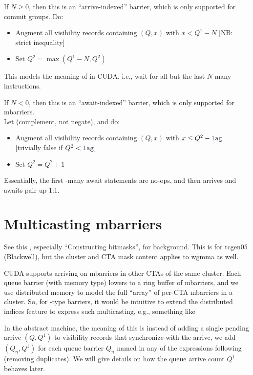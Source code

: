 \filbreak
If $N \geq 0$, then this is an ``arrive-indexed'' barrier, which is only supported for commit groups. Do:
\begin{itemize}
  \item Augment all visibility records containing $(Q, x)$ with $x < Q^1 - N$ [NB: strict inequality]
  \item Set $Q^2 = \max(Q^1 - N, Q^2)$
\end{itemize}
This models the meaning of  in CUDA, i.e., wait for all but the last $N$-many  instructions.

\filbreak
If $N < 0$, then this is an ``await-indexed'' barrier, which is only supported for mbarriers.\\
Let  (complement, not negate), and do:
\begin{itemize}
  \item Augment all visibility records containing $(Q, x)$ with $x \leq Q^2 - \lighttt{lag}$ [trivially false if $Q^2 < \lighttt{lag}$]
  \item Set $Q^2 = Q^2 + 1$
\end{itemize}
Essentially, the first -many await statements are no-ops, and then arrives and awaits pair up 1:1.

\newpage
\section{Multicasting mbarriers}
\label{ch:Multicasting}

See this , especially ``Constructing bitmasks'', for background.
This is for tcgen05 (Blackwell), but the cluster and CTA mask content applies to wgmma as well.

\filbreak
CUDA supports arriving on mbarriers in other CTAs of the same cluster.
Each queue barrier (with  memory type) lowers to a ring buffer of mbarriers, and we use distributed memory to model the full ``array'' of per-CTA mbarriers in a cluster.
So, for -type barriers, it would be intuitive to extend the distributed indices feature to express such multicasting, e.g., something like

\filbreak


\filbreak
In the abstract machine, the meaning of this is instead of adding a single pending arrive $(Q, Q^1)$ to visibility records that synchronize-with the arrive, we add $(Q_n, Q^1)$ for each queue barrier $Q_n$ named in any of the expressions following \lighttt{>>} (removing duplicates).
We will give details on how the queue arrive count $Q^1$ behaves later.

